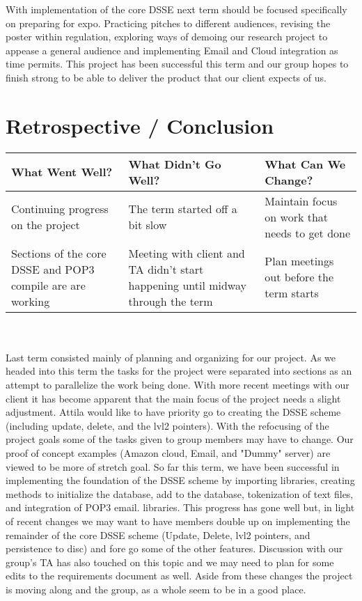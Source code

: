\documentclass[onecolumn, draftclsnofoot,10pt, compsoc]{IEEEtran}
\begin{document}
With implementation of the core DSSE next term should be focused specifically on preparing for expo. Practicing pitches to different audiences, revising the poster within regulation, exploring ways of demoing our research project to appease a general audience and implementing Email and Cloud integration as time permits. This project has been successful this term and our group hopes to finish strong to be able to deliver the product that our client expects of us.



\section {Retrospective / Conclusion}

\begin{tabular} {p{5.4cm} | p{5.4cm}  | p{5.4cm} }
\hline
\textbf{What Went Well?} & \textbf{What Didn't Go Well?} & \textbf{What Can We Change?} \\
\hline
Continuing progress on the project & The term started off a bit slow & Maintain focus on work that needs to get done \\ 
\hline
 Sections of the core DSSE and POP3 compile are are working & Meeting with client and TA didn't start happening until midway through the term & Plan meetings out before the term starts \\
\hline
\end {tabular}
\\ \\ 
Last term consisted mainly of planning and organizing for our project. As we headed into this term the tasks for the project were separated into sections as an attempt to parallelize the work being done. With more recent meetings with our client it has become apparent that the main focus of the project needs a slight adjustment. Attila would like to have priority go to creating the DSSE scheme (including update, delete, and the lvl2 pointers). With the refocusing of the project goals some of the tasks given to group members may have to change. Our proof of concept examples (Amazon cloud, Email, and "Dummy" server) are viewed to be more of stretch goal. So far this term, we have been successful in implementing the foundation of the DSSE scheme by importing libraries, creating methods to initialize the database, add to the database, tokenization of text files, and integration of POP3 email. libraries. This progress has gone well but, in light of recent changes we may want to have members double up on implementing the remainder of the core DSSE scheme (Update, Delete, lvl2 pointers, and persistence to disc) and fore go some of the other features. Discussion with our group's TA has also touched on this topic and we may need to plan for some edits to the requirements document as well. Aside from these changes the project is moving along and the group, as a whole seem to be in a good place. 


{}
\end{document}
